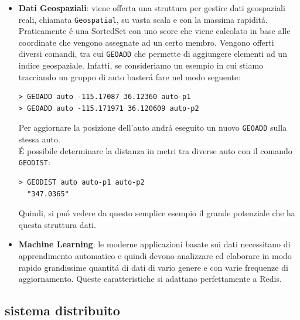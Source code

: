\begin{itemize}
    \item \textbf{Dati Geospaziali}: viene offerta una struttura per gestire dati geospaziali reali, chiamata \texttt{Geospatial},
    su vasta scala e con la massima rapiditá. Praticamente é una SortedSet con uno score che viene calcolato in base alle coordinate che vengono assegnate ad un certo membro.
    Vengono offerti diversi comandi, tra cui \texttt{GEOADD} che permette di aggiungere elementi ad un indice geospaziale.
    Infatti, se consideriamo un esempio in cui stiamo tracciando un gruppo di auto basterá fare nel modo seguente:
    \begin{lstlisting}[autogobble]
> GEOADD auto -115.17087 36.12360 auto-p1
> GEOADD auto -115.171971 36.120609 auto-p2\end{lstlisting}
    Per aggiornare la posizione dell'auto andrá eseguito un nuovo \texttt{GEOADD} sulla stessa auto.\\
    É possibile determinare la distanza in metri tra diverse auto con il comando \texttt{GEODIST}:
    \begin{lstlisting}[autogobble]
> GEODIST auto auto-p1 auto-p2
  "347.0365"\end{lstlisting}
    Quindi, si puó vedere da questo semplice esempio il grande potenziale che ha questa struttura dati.
    \item \textbf{Machine Learning}: le moderne applicazioni basate sui dati necessitano di apprendimento automatico e quindi devono analizzare
    ed elaborare in modo rapido grandissime quantitá di dati di vario genere e con varie frequenze di aggiornamento. Queste caratteristiche
    si adattano perfettamente a Redis.
\end{itemize}

\subsection{sistema distribuito }






